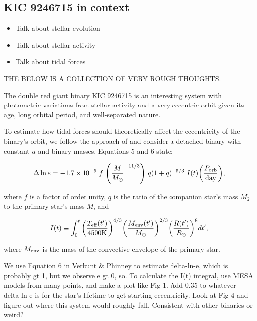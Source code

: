 \subsection{KIC 9246715 in context}\label{context}
\begin{itemize}
\item Talk about stellar evolution
\item Talk about stellar activity
\item Talk about tidal forces
\end{itemize}

THE BELOW IS A COLLECTION OF VERY ROUGH THOUGHTS.

The double red giant binary KIC 9246715 is an interesting system with photometric variations from stellar activity and a very eccentric orbit given its age, long orbital period, and well-separated nature.

To estimate how tidal forces should theoretically affect the eccentricity of the binary's orbit, we follow the approach of \citet{ver95} and consider a detached binary with constant $a$ and binary masses. Equations 5 and 6 \citep{ver95} state:

\begin{equation}\label{tide1}
\Delta \ln e = -1.7 \times 10^{-5} \ f \ {\left( \frac{M}{M_{\odot}}^{-11/3} \right)} \ q(1+q)^{-5/3} \ I(t) {\left( \frac{P_{\rm{orb}}}{\rm{day}} \right)},
\end{equation}

where $f$ is a factor of order unity, $q$ is the ratio of the companion star's mass $M_2$ to the primary star's mass $M$, and

\begin{equation}
I(t) \equiv \int_0^t {\left( \frac{T_{\rm{eff}}(t')}{4500 \rm{K}} \right)}^{4/3} {\left( \frac{M_{\rm{env}}(t')}{M_{\odot}} \right)}^{2/3} {\left( \frac{R(t')}{R_{\odot}} \right)}^8 dt',
\end{equation}

where $M_{\rm{env}}$ is the mass of the convective envelope of the primary star.

We use Equation 6 in  Verbunt & Phinney to estimate delta-ln-e, which is probably gt 1, but we observe e gt 0, so.
To calculate the I(t) integral, use MESA models from many points, and make a plot like Fig 1.
Add 0.35 to whatever delta-ln-e is for the star's lifetime to get starting eccentricity.
Look at Fig 4 and figure out where this system would roughly fall. Consistent with other binaries or weird?

